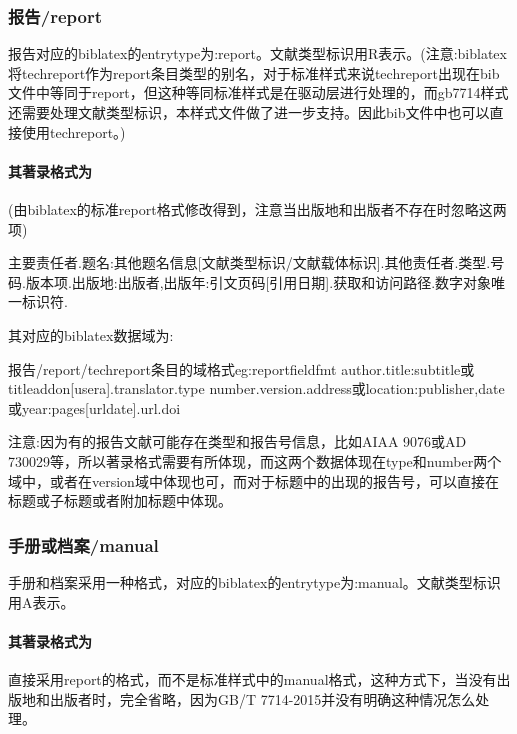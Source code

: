 \subsubsection{报告/report}
\begin{refentry}{}{}
报告对应的biblatex的entrytype为:report。文献类型标识用R表示。(注意:biblatex将techreport作为report条目类型的别名，对于标准样式来说techreport出现在bib文件中等同于report，但这种等同标准样式是在驱动层进行处理的，而gb7714样式还需要处理文献类型标识，本样式文件做了进一步支持。因此bib文件中也可以直接使用techreport。)

\paragraph{其著录格式为} (由biblatex的标准report格式修改得到，注意当出版地和出版者不存在时忽略这两项)

主要责任者.题名:其他题名信息[文献类型标识/文献载体标识].其他责任者.类型.号码.版本项.出版地:出版者,出版年:引文页码[引用日期].获取和访问路径.数字对象唯一标识符.
\end{refentry}

其对应的biblatex数据域为:
\begin{codetex}{报告/report/techreport条目的域格式}{eg:reportfieldfmt}
author.title:subtitle或titleaddon[usera].translator.type number.version.address或location:publisher,date或year:pages[urldate].url.doi
\end{codetex}

注意:因为有的报告文献可能存在类型和报告号信息，比如AIAA 9076或AD 730029等，所以著录格式需要有所体现，而这两个数据体现在type和number两个域中，或者在version域中体现也可，而对于标题中的出现的报告号，可以直接在标题或子标题或者附加标题中体现。

\subsubsection{手册或档案/manual}
\begin{refentry}{}{}
手册和档案采用一种格式，对应的biblatex的entrytype为:manual。文献类型标识用A表示。

\paragraph{其著录格式为} 直接采用report的格式，而不是标准样式中的manual格式，这种方式下，当没有出版地和出版者时，完全省略，因为GB/T 7714-2015并没有明确这种情况怎么处理。
\end{refentry}

